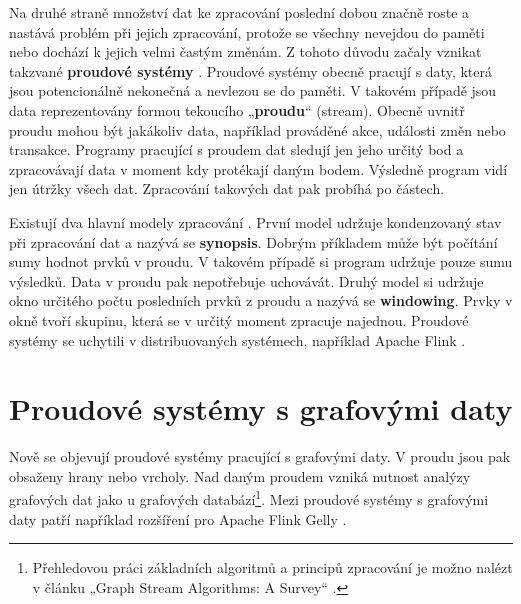 Na druhé straně množství dat ke zpracování poslední dobou značně roste a nastává problém při jejich zpracování, protože se všechny nevejdou do paměti nebo dochází k jejich velmi častým změnám.  
Z tohoto důvodu začaly vznikat takzvané \textbf{proudové systémy} \citep{streaming}.
Proudové systémy obecně pracují s daty, která jsou potencionálně nekonečná a nevlezou se do paměti.
V takovém případě jsou data reprezentovány formou tekoucího „\textbf{proudu}“ (stream).
Obecně uvnitř proudu mohou být jakákoliv data, například prováděné akce, události změn nebo transakce.
Programy pracující s proudem dat sledují jen jeho určitý bod a zpracovávají data v moment kdy protékají daným bodem.
Výsledně program vidí jen útržky všech dat.
Zpracování takových dat pak probíhá po částech.

Existují dva hlavní modely zpracování \citep{graphstreaming}.
První model udržuje kondenzovaný stav při zpracování dat a nazývá se \textbf{synopsis}.
Dobrým příkladem může být počítání sumy hodnot prvků v proudu.
V takovém případě si program udržuje pouze sumu výsledků.
Data v proudu pak nepotřebuje uchovávát.
Druhý model si udržuje okno určitého počtu posledních prvků z proudu a nazývá se \textbf{windowing}.
Prvky v okně tvoří skupinu, která se v určitý moment zpracuje najednou.
Proudové systémy se uchytili v distribuovaných systémech, například Apache Flink \citep{apacheflink}.

\section*{Proudové systémy s grafovými daty}

Nově se objevují proudové systémy pracující s grafovými daty.
V proudu jsou pak obsaženy hrany nebo vrcholy. 
Nad daným proudem vzniká nutnost analýzy grafových dat jako u grafových databází\footnote{Přehledovou práci základních algoritmů a principů zpracování je možno nalézt v článku „Graph Stream Algorithms: A Survey“ \citep{graphstreamalgorithms}.}.
Mezi proudové systémy s grafovými daty patří například rozšíření pro Apache Flink Gelly \citep{apacheflinkgelly}.

